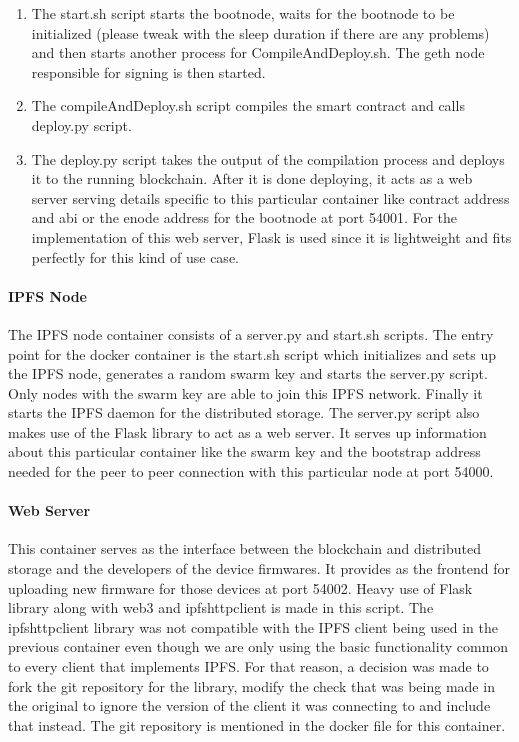\documentclass{article}
\begin{document}
\begin{enumerate}
\begin{itemize}
    \end{itemize}
    \item The start.sh script starts the bootnode, waits for the bootnode to be initialized (please tweak with the sleep duration if there are any problems) and then starts another process for CompileAndDeploy.sh. The geth node responsible for signing is then started.
    \item The compileAndDeploy.sh script compiles the smart contract and calls deploy.py script.
    \item The deploy.py script takes the output of the compilation process and deploys it to the running blockchain. After it is done deploying, it acts as a web server serving details specific to this particular container like contract address and abi or the enode address for the bootnode at port 54001. For the implementation of this web server, Flask is used since it is lightweight and fits perfectly for this kind of use case.
\end{enumerate}

\paragraph{IPFS Node}
The IPFS node container consists of a server.py and start.sh scripts. The entry point for the docker container is the start.sh script which initializes and sets up the IPFS node, generates a random swarm key and starts the server.py script. Only nodes with the swarm key are able to join this IPFS network. Finally it starts the IPFS daemon for the distributed storage.
The server.py script also makes use of the Flask library to act as a web server. It serves up information about this particular container like the swarm key and the bootstrap address needed for the peer to peer connection with this particular node at port 54000.

\paragraph{Web Server}
This container serves as the interface between the blockchain and distributed storage and the developers of the device firmwares. It provides as the frontend for uploading new firmware for those devices at port 54002.
Heavy use of Flask library along with web3 and ipfshttpclient is made in this script.
The ipfshttpclient library was not compatible with the IPFS client being used in the previous container even though we are only using the basic functionality common to every client that implements IPFS. For that reason, a decision was made to fork the git repository for the library, modify the check that was being made in the original to ignore the version of the client it was connecting to and include that instead. The git repository is mentioned in the docker file for this container.
\end{document}
